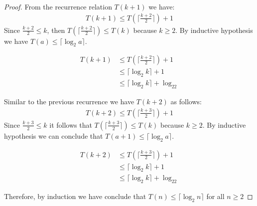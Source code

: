 \documentclass[9pt]{exam}
\begin{document}
\begin{parts}
\begin{customsolutionbox}
\begin{proof}
            From the recurrence relation $T(k+1)$ we have:
            \begin{gather}
                T(k+1) \leq T(\lceil \frac{k+2}{2}\rceil) + 1
            \end{gather}
            Since $\frac{k+2}{2} \leq k$, then $T(\lceil \frac{k+2}{2}\rceil) \leq T(k)$ because $k \geq 2$. By inductive hypothesis we have $T(a) \leq \lceil\log_{2}a\rceil$.

            \begin{align*}
                T(k+1) &\leq T(\lceil \frac{k+2}{2}\rceil) + 1 \\
                &\leq \lceil\log_2k\rceil +1 \\
                &\leq \lceil\log_2k\rceil + \log_22
            \end{align*}

            Similar to the previous recurrence we have $T(k+2)$ as follows:
            \begin{gather}
                T(k+2) \leq T(\lceil \frac{k+3}{2}\rceil) + 1
            \end{gather}
            Since $\frac{k+3}{2} \leq k$ it follows that $T(\lceil \frac{k+3}{2}\rceil) \leq T(k)$ because $k \geq 2$. By inductive hypothesis we can conclude that $T(a+1) \leq \lceil\log_{2}a\rceil$.

            \begin{align*}
                T(k+2) &\leq T(\lceil \frac{k+3}{2}\rceil)  + 1 \\
                &\leq \lceil\log_2k\rceil +1 \\
                &\leq \lceil\log_2k\rceil + \log_22
            \end{align*}

            Therefore, by induction we have conclude that $T(n) \leq \lceil \log_2n \rceil$ for all $ n\geq 2$
        \end{proof}
    \end{customsolutionbox}
\end{parts}
\end{document}
